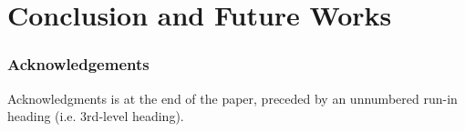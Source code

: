 \documentclass[runningheads]{llncs}
\begin{document}
\section{Conclusion and Future Works}
\label{sec:conlusion}


\subsubsection*{Acknowledgements}
Acknowledgments is at the end of the paper, preceded by an unnumbered run-in heading (i.e.
3rd-level heading).

%
%
%


%
\end{document}
